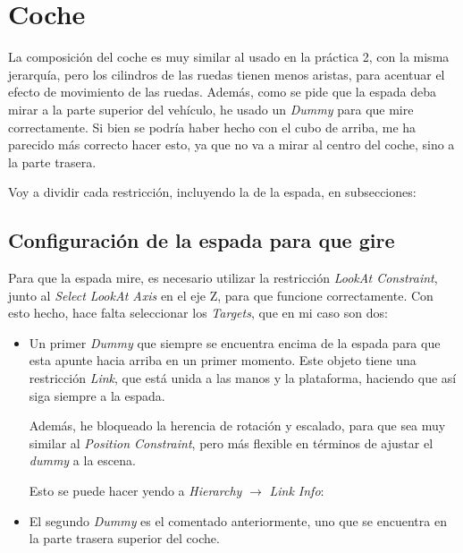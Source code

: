 \section{Coche}

La composición del coche es muy similar al usado en la práctica 2, con la misma jerarquía, pero los cilindros de las ruedas tienen menos aristas, para acentuar el efecto de movimiento de las ruedas. Además, como se pide que la espada deba mirar a la parte superior del vehículo, he usado un \textit{Dummy} para que mire correctamente. Si bien se podría haber hecho con el cubo de arriba, me ha parecido más correcto hacer esto, ya que no va a mirar al centro del coche, sino a la parte trasera.

\bigskip

Voy a dividir cada restricción, incluyendo la de la espada, en subsecciones:


\subsection{Configuración de la espada para que gire}

Para que la espada mire, es necesario utilizar la restricción \textit{LookAt Constraint}, junto al \textit{Select LookAt Axis} en el eje Z, para que funcione correctamente. Con esto hecho, hace falta seleccionar los \textit{Targets}, que en mi caso son dos:

\begin{itemize}
    \item Un primer \textit{Dummy} que siempre se encuentra encima de la espada para que esta apunte hacia arriba en un primer momento. Este objeto tiene una restricción \textit{Link}, que está unida a las manos y la plataforma, haciendo que así siga siempre a la espada.
    
    Además, he bloqueado la herencia de rotación y escalado, para que sea muy similar al \textit{Position Constraint}, pero más flexible en términos de ajustar el \textit{dummy} a la escena.

    Esto se puede hacer yendo a \textit{Hierarchy} $\rightarrow$ \textit{Link Info}:


    \item El segundo \textit{Dummy} es el comentado anteriormente, uno que se encuentra en la parte trasera superior del coche.
\end{itemize}

